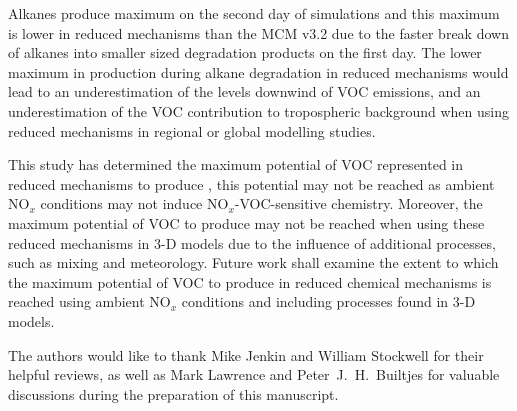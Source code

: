 \documentclass[acpd, online, hvmath]{copernicus}
\begin{document}
Alkanes produce maximum  on the second day of simulations
and this maximum is lower in reduced mechanisms than the MCM v3.2 due
to the faster break down of alkanes into smaller sized degradation
products on the first day.  The lower maximum in  production
during alkane degradation in reduced mechanisms would lead to an
underestimation of the  levels downwind of VOC emissions,
and an underestimation of the VOC contribution to tropospheric
background  when using reduced mechanisms in regional or
global modelling studies.

This study has determined the maximum potential of VOC represented in
reduced mechanisms to produce , this potential may not be
reached as ambient NO$_{x}$ conditions may not induce
NO$_{x}$-VOC-sensitive chemistry.  Moreover, the maximum potential
of VOC to produce  may not be reached when using these
reduced mechanisms in 3-D models due to the influence of additional
processes, such as mixing and meteorology.  Future work shall examine
the extent to which the maximum potential of VOC to produce 
in reduced chemical mechanisms is reached using ambient NO$_{x}$
conditions and including processes found in 3-D models.






\begin{acknowledgements}
  The authors would like to thank Mike Jenkin and William Stockwell for their
  helpful reviews, as well as Mark Lawrence and
  Peter~J.~H.~Builtjes for valuable discussions during the preparation
  of this manuscript.
\end{acknowledgements}
\end{document}
